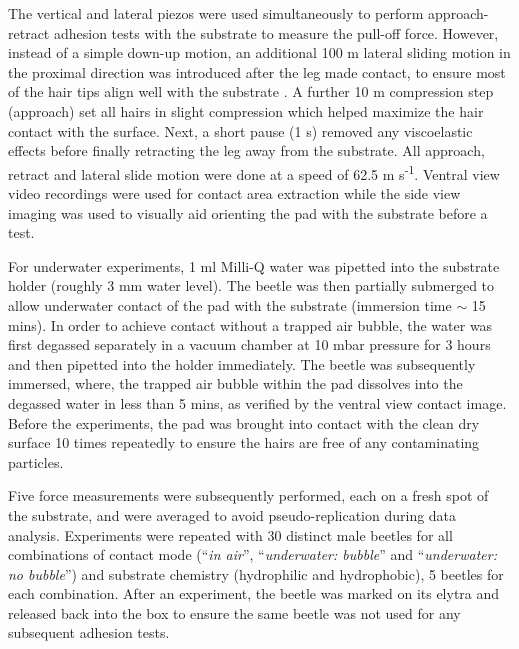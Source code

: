 \documentclass[vruler,JEB]{COB}%
\begin{document}
The vertical and lateral piezos were used simultaneously to perform approach-retract
adhesion tests with the substrate to measure the pull-off force. However,
instead of a simple down-up motion, an additional 100 \textmu m lateral sliding motion in the proximal direction 
was introduced after the leg made contact, to ensure most of the hair tips align well with the substrate \citep{RN19}.
A further 10 \textmu m compression step (approach) set all hairs in slight compression which helped maximize the hair contact
with the surface. Next, a short pause (1 s) removed any
viscoelastic effects before finally retracting the leg away from the
substrate. All approach, retract and lateral slide motion were done
at a speed of 62.5 \textmu m s\protect\textsuperscript{-1}. Ventral view video recordings
were used for contact area extraction while the side view imaging
was used to visually aid orienting the pad with the substrate before
a test.

For underwater experiments, 1 ml Milli-Q water was pipetted into the
substrate holder (roughly 3 mm water level). The beetle was then partially 
submerged to allow underwater contact of the pad with the substrate (immersion time $\sim$ 15 mins). In order to achieve contact without
a trapped air bubble, the water was first degassed separately in a vacuum chamber
at 10 mbar pressure for 3 hours and then pipetted into the holder immediately. The beetle was subsequently immersed, where, the trapped air bubble within the pad dissolves into the degassed water in less than 5 mins, as verified by the ventral view contact image. Before the experiments,
the pad was brought into contact with the clean dry surface 10 times repeatedly 
to ensure the hairs are free of any contaminating particles. 

Five force measurements were subsequently performed, each on a fresh spot of the substrate, and were averaged to avoid pseudo-replication during data analysis. Experiments were repeated with 30 distinct male beetles for all combinations of contact mode (``\emph{in air}'', ``\emph{underwater:
bubble}'' and ``\emph{underwater: no bubble}'') and substrate chemistry (hydrophilic and hydrophobic), 5 beetles for each  combination. After an experiment, the beetle was marked on its elytra and released back into the box to ensure the same beetle was not used for any subsequent adhesion tests.
\end{document}

